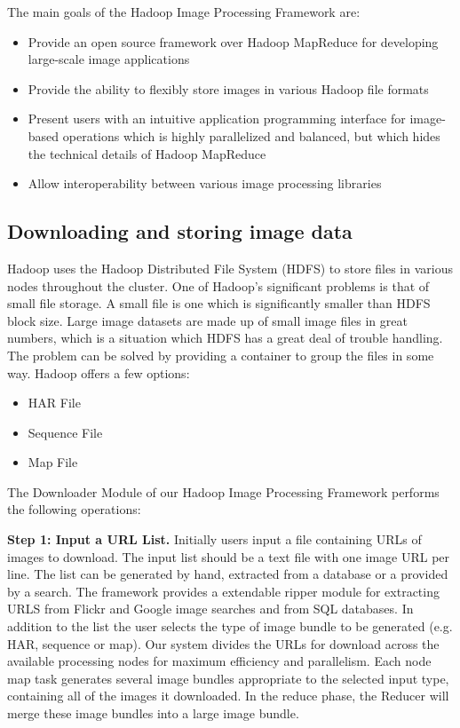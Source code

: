 \documentclass[conference]{IEEEtran}
\begin{document}
The main goals of the Hadoop Image Processing Framework are:
\begin{itemize}
\item Provide an open source framework over Hadoop MapReduce for
  developing large-scale image applications
\item Provide the ability to flexibly store images in various Hadoop
  file formats
\item Present users with an intuitive application programming
  interface for image-based operations which is highly parallelized
  and balanced, but which hides the technical details of Hadoop
  MapReduce
\item Allow interoperability between various image processing
  libraries
\end{itemize}

\subsection{Downloading and storing image data}
Hadoop uses the Hadoop Distributed File System (HDFS)\cite{Shvachko2010} to store files
in various nodes throughout the cluster.  One of Hadoop's significant
problems is that of small file storage. \cite{White2009} A small file
is one which is significantly smaller than HDFS block size.  Large
image datasets are made up of small image files in great numbers,
which is a situation which HDFS has a great deal of trouble
handling. The problem can be solved by providing a container to group
the files in some way. Hadoop offers a few options:
\begin{itemize}
	\item HAR File
	\item Sequence File
	\item Map File
\end{itemize}

The Downloader Module of our Hadoop Image Processing Framework
performs the following operations:

\textbf{Step 1: Input a URL List.} Initially users input a file
containing URLs of images to download. The input list should be a text
file with one image URL per line. The list can be generated by hand,
extracted from a database or a provided by a search. The framework
provides a extendable ripper module for extracting URLS from Flickr
and Google image searches and from SQL databases. In addition to the
list the user selects the type of image bundle to be generated
(e.g. HAR, sequence or map).  Our system divides the URLs for download
across the available processing nodes for maximum efficiency and
parallelism.  Each node map task generates several image bundles
appropriate to the selected input type, containing all of the images
it downloaded. In the reduce phase, the Reducer will merge these image
bundles into a large image bundle.
\end{document}
